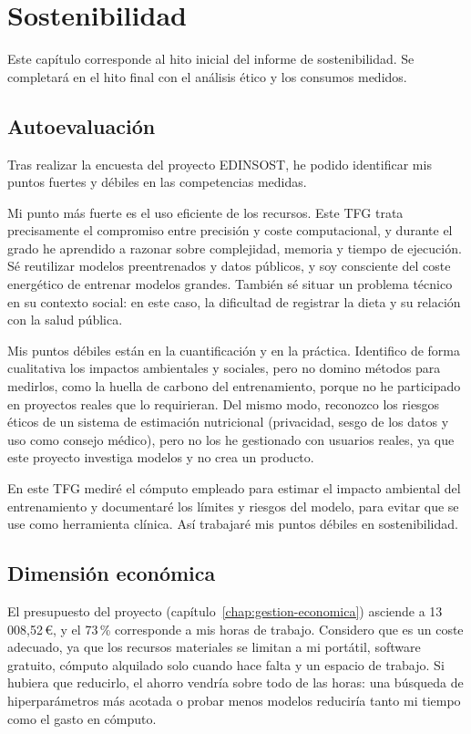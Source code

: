 \chapter{Sostenibilidad}
\label{chap:sostenibilidad}

\begingroup
\normalsize
{}
\setlength{\parskip}{0.3\baselineskip}

Este capítulo corresponde al hito inicial del informe de sostenibilidad. Se
completará en el hito final con el análisis ético y los consumos medidos.

\section{Autoevaluación}

Tras realizar la encuesta del proyecto EDINSOST, he podido identificar mis
puntos fuertes y débiles en las competencias medidas.

Mi punto más fuerte es el uso eficiente de los recursos. Este TFG trata
precisamente el compromiso entre precisión y coste computacional, y durante el
grado he aprendido a razonar sobre complejidad, memoria y tiempo de ejecución.
Sé reutilizar modelos preentrenados y datos públicos, y soy consciente del
coste energético de entrenar modelos grandes. También sé situar un problema
técnico en su contexto social: en este caso, la dificultad de registrar la dieta y su
relación con la salud pública.

Mis puntos débiles están en la cuantificación y en la práctica. Identifico de
forma cualitativa los impactos ambientales y sociales, pero no domino métodos
para medirlos, como la huella de carbono del entrenamiento, porque no he
participado en proyectos reales que lo requirieran. Del mismo modo, reconozco
los riesgos éticos de un sistema de estimación nutricional (privacidad, sesgo
de los datos y uso como consejo médico), pero no los he gestionado con
usuarios reales, ya que este proyecto investiga modelos y no crea un producto.

En este TFG mediré el cómputo empleado para estimar el impacto ambiental del
entrenamiento y documentaré los límites y riesgos del modelo, para evitar que
se use como herramienta clínica. Así trabajaré mis puntos débiles en
sostenibilidad.

\section{Dimensión económica}

El presupuesto del proyecto (capítulo~\ref{chap:gestion-economica}) asciende a
13\,008,52\,€, y el 73\,\% corresponde a mis horas de trabajo. Considero que es
un coste adecuado, ya que los recursos materiales se limitan a mi portátil,
software gratuito, cómputo alquilado solo cuando hace falta y un espacio de
trabajo. Si hubiera que reducirlo, el ahorro vendría sobre todo de las horas:
una búsqueda de hiperparámetros más acotada o probar menos modelos reduciría
tanto mi tiempo como el gasto en cómputo.


